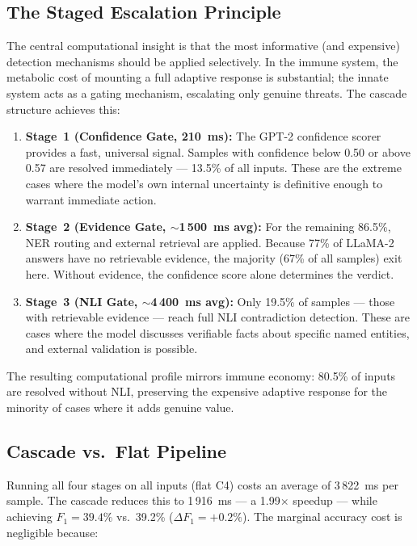 \documentclass[11pt,a4paper]{article}
\newcommand{\fone}{F_1}
\begin{document}
\subsection{The Staged Escalation Principle}

The central computational insight is that the most informative (and expensive)
detection mechanisms should be applied selectively. In the immune system, the
metabolic cost of mounting a full adaptive response is substantial; the innate
system acts as a gating mechanism, escalating only genuine threats. The cascade
structure achieves this:

\begin{enumerate}
\item \textbf{Stage~1 (Confidence Gate, 210~ms):} The GPT-2 confidence scorer
      provides a fast, universal signal. Samples with confidence below 0.50 or
      above 0.57 are resolved immediately --- 13.5\% of all inputs. These are
      the extreme cases where the model's own internal uncertainty is definitive
      enough to warrant immediate action.

\item \textbf{Stage~2 (Evidence Gate, $\sim$1\,500~ms avg):} For the remaining
      86.5\%, NER routing and external retrieval are applied. Because 77\% of
      LLaMA-2 answers have no retrievable evidence, the majority (67\% of all
      samples) exit here. Without evidence, the confidence score alone determines
      the verdict.

\item \textbf{Stage~3 (NLI Gate, $\sim$4\,400~ms avg):} Only 19.5\% of samples
      --- those with retrievable evidence --- reach full NLI contradiction
      detection. These are cases where the model discusses verifiable facts about
      specific named entities, and external validation is possible.
\end{enumerate}

The resulting computational profile mirrors immune economy: 80.5\% of inputs are
resolved without NLI, preserving the expensive adaptive response for the
minority of cases where it adds genuine value.

\subsection{Cascade vs.\ Flat Pipeline}

Running all four stages on all inputs (flat C4) costs an average of 3\,822~ms
per sample. The cascade reduces this to 1\,916~ms --- a 1.99$\times$ speedup
--- while achieving $\fone = 39.4\%$ vs.\ 39.2\% ($\Delta\fone = +0.2\%$). The
marginal accuracy cost is negligible because:
\end{document}
